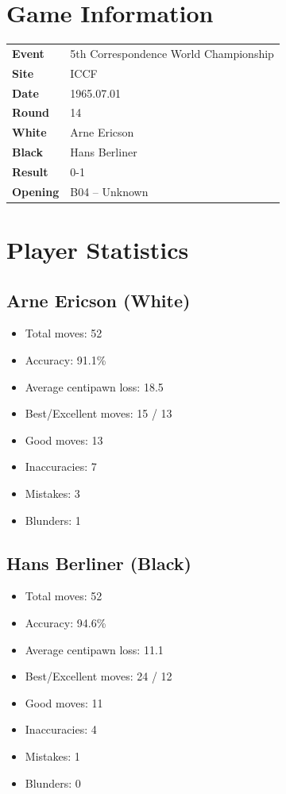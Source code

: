 \documentclass[11pt]{book}
\begin{document}
\section{Game Information}
\begin{tabular}{ll}
\textbf{Event} & 5th Correspondence World Championship \\
\textbf{Site} & ICCF \\
\textbf{Date} & 1965.07.01 \\
\textbf{Round} & 14 \\
\textbf{White} & Arne Ericson \\
\textbf{Black} & Hans Berliner \\
\textbf{Result} & 0-1 \\
\textbf{Opening} & B04 -- Unknown \\
\end{tabular}

\section{Player Statistics}

\subsection{Arne Ericson (White)}
\begin{itemize}
\item Total moves: 52
\item Accuracy: 91.1\%
\item Average centipawn loss: 18.5
\item Best/Excellent moves: 15 / 13
\item Good moves: 13
\item Inaccuracies: 7
\item Mistakes: 3
\item Blunders: 1
\end{itemize}

\subsection{Hans Berliner (Black)}
\begin{itemize}
\item Total moves: 52
\item Accuracy: 94.6\%
\item Average centipawn loss: 11.1
\item Best/Excellent moves: 24 / 12
\item Good moves: 11
\item Inaccuracies: 4
\item Mistakes: 1
\item Blunders: 0
\end{itemize}
\end{document}
